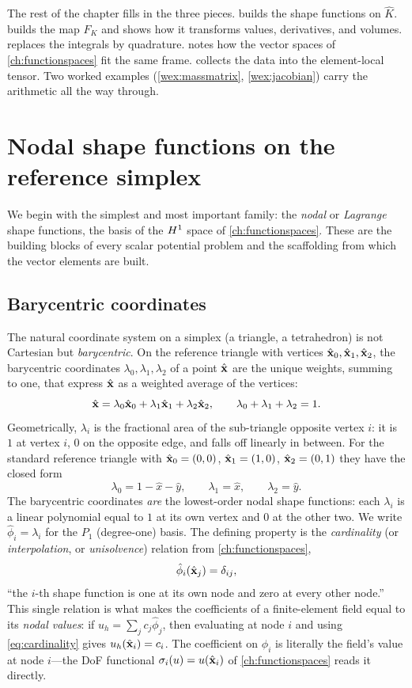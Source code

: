 The rest of the chapter fills in the three pieces.  builds the shape
functions on $\hat K$.  builds the map $F_K$ and shows how it
transforms values, derivatives, and volumes.  replaces the integrals
by quadrature.  notes how the vector spaces of
\cref{ch:functionspaces} fit the same frame.  collects the data
into the element-local tensor. Two worked examples (\cref{wex:massmatrix},
\cref{wex:jacobian}) carry the arithmetic all the way through.

\section{Nodal shape functions on the reference simplex}
\label{sec:shape}

We begin with the simplest and most important family: the \emph{nodal} or
\emph{Lagrange} shape functions, the basis of the $H^1$ space of
\cref{ch:functionspaces}. These are the building blocks of every scalar potential
problem and the scaffolding from which the vector elements are built.

\subsection{Barycentric coordinates}

The natural coordinate system on a simplex (a triangle, a tetrahedron) is not
Cartesian but \emph{barycentric}. On the reference triangle with vertices
$\hat{\mathbf{x}}_0,\hat{\mathbf{x}}_1,\hat{\mathbf{x}}_2$, the barycentric coordinates
$\lambda_0,\lambda_1,\lambda_2$ of a point $\hat{\mathbf{x}}$ are the unique weights, summing
to one, that express $\hat{\mathbf{x}}$ as a weighted average of the vertices:
\[
  \hat{\mathbf{x}} = \lambda_0\hat{\mathbf{x}}_0 + \lambda_1\hat{\mathbf{x}}_1 + \lambda_2\hat{\mathbf{x}}_2,
  \qquad \lambda_0+\lambda_1+\lambda_2 = 1.
\]
Geometrically, $\lambda_i$ is the fractional area of the sub-triangle opposite
vertex $i$: it is $1$ at vertex $i$, $0$ on the opposite edge, and falls off linearly
in between. For the standard reference triangle with $\hat{\mathbf{x}}_0=(0,0)$,
$\hat{\mathbf{x}}_1=(1,0)$, $\hat{\mathbf{x}}_2=(0,1)$ they have the closed form
\[
  \lambda_0 = 1-\hat x-\hat y, \qquad
  \lambda_1 = \hat x, \qquad
  \lambda_2 = \hat y.
\]
The barycentric coordinates \emph{are} the lowest-order nodal shape functions: each
$\lambda_i$ is a linear polynomial equal to $1$ at its own vertex and $0$ at the
other two. We write $\hat\phi_i = \lambda_i$ for the $P_1$ (degree-one) basis. The
defining property is the \emph{cardinality} (or \emph{interpolation}, or
\emph{unisolvence}) relation from \cref{ch:functionspaces},
\begin{equation}
  \hat\phi_i(\hat{\mathbf{x}}_j) = \delta_{ij},
  \label{eq:cardinality}
\end{equation}
``the $i$-th shape function is one at its own node and zero at every other node.''
This single relation is what makes the coefficients of a finite-element field equal
to its \emph{nodal values}: if $u_h = \sum_j c_j\hat\phi_j$, then evaluating at node
$i$ and using \eqref{eq:cardinality} gives $u_h(\hat{\mathbf{x}}_i)=c_i$. The coefficient on
$\hat\phi_i$ is literally the field's value at node $i$---the DoF functional
$\sigma_i(u)=u(\hat{\mathbf{x}}_i)$ of \cref{ch:functionspaces} reads it directly.

